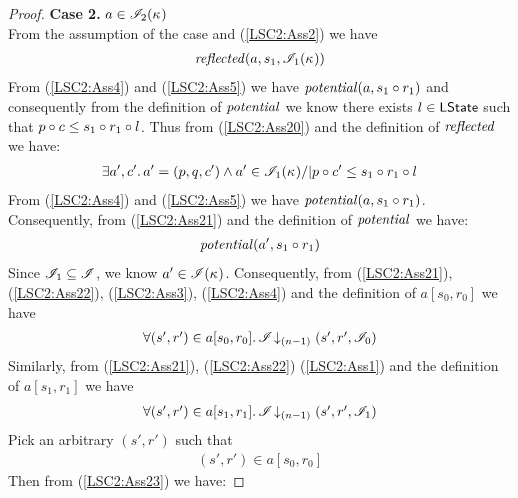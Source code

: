 \begin{lemma}
\begin{proof}
\noindent\textbf{Case 2. } $a \in \mathscr{I}_2(\kappa_{})$\\
From the assumption of the case and (\ref{LSC2:Ass2}) we have
%
\begin{align}
	\mathit{reflected}(a, s_1, \mathscr{I}_1(\kappa_{}))
	\label{LSC2:Ass20}
\end{align}
From (\ref{LSC2:Ass4}) and (\ref{LSC2:Ass5}) we have $\mathit{potential}(a, s_1 \circ r_1)$ and consequently from the definition of $\mathit{potential}$ we know there exists $l \in \textsf{LState}$ such that $p \circ c \leq s_1 \circ r_1 \circ l$. Thus from (\ref{LSC2:Ass20}) and the definition of $\mathit{reflected}$ we have:
%
\begin{align}
	\exists a', c'.\, a' = (p, q, c') \land a' \in \mathscr{I}_1(\kappa_{})   /| p \circ c' \leq s_1 \circ r_1 \circ l
	\label{LSC2:Ass21}
\end{align}
%
From (\ref{LSC2:Ass4}) and (\ref{LSC2:Ass5}) we have $\mathit{potential}(a, s_1 \circ r_1)$. Consequently, from (\ref{LSC2:Ass21}) and the definition of $\mathit{potential}$ we have:
%
\begin{align}
	\mathit{potential}(a', s_1 \circ r_1)
	\label{LSC2:Ass22}
\end{align}
%
Since $\mathscr{I}_1 \subseteq \mathscr{I}$, we know $a' \in \mathscr{I}(\kappa_{})$. Consequently, from (\ref{LSC2:Ass21}), (\ref{LSC2:Ass22}), (\ref{LSC2:Ass3}), (\ref{LSC2:Ass4}) and the definition of $a[s_0, r_0]$ we have
%
\begin{align}
	\begin{array}{@{} l @{}}
		\for{(s', r') \in a[s_0, r_0]} \extendsAMUpto{\lmod}{(n-1)}{s'}{r'}{\lmod_0}
	\end{array}
	\label{LSC2:Ass23}
\end{align}
%
Similarly, from (\ref{LSC2:Ass21}), (\ref{LSC2:Ass22}) (\ref{LSC2:Ass1}) and the definition of $a[s_1, r_1]$ we have
%
\begin{align}
	\begin{array}{@{} l @{}}
		\for{(s', r') \in a[s_1, r_1]} \extendsAMUpto{\lmod}{(n-1)}{s'}{r'}{\lmod_1}
	\end{array}
	\label{LSC2:Ass24}
\end{align}
%
Pick an arbitrary $(s', r')$ such that
%
\begin{align}
	(s', r') \in a[s_0, r_0]
	\label{LSC2:Ass25}
\end{align}
Then from (\ref{LSC2:Ass23}) we have: 

\end{proof}
\end{lemma}
